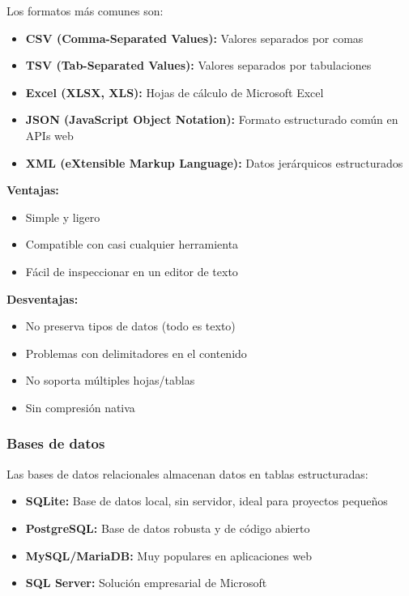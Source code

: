 \documentclass[a4paper,11pt]{article}
\begin{document}
Los formatos más comunes son:

\begin{itemize}
    \item \textbf{CSV (Comma-Separated Values):} Valores separados por comas
    \item \textbf{TSV (Tab-Separated Values):} Valores separados por tabulaciones
    \item \textbf{Excel (XLSX, XLS):} Hojas de cálculo de Microsoft Excel
    \item \textbf{JSON (JavaScript Object Notation):} Formato estructurado común en APIs web
    \item \textbf{XML (eXtensible Markup Language):} Datos jerárquicos estructurados
\end{itemize}

\begin{tcolorbox}[colback=ejemplocolor!20, colframe=unidadcolor, title=Ventajas y desventajas de CSV]
\textbf{Ventajas:}
\begin{itemize}
    \item Simple y ligero
    \item Compatible con casi cualquier herramienta
    \item Fácil de inspeccionar en un editor de texto
\end{itemize}

\textbf{Desventajas:}
\begin{itemize}
    \item No preserva tipos de datos (todo es texto)
    \item Problemas con delimitadores en el contenido
    \item No soporta múltiples hojas/tablas
    \item Sin compresión nativa
\end{itemize}
\end{tcolorbox}

\subsubsection{Bases de datos}

Las bases de datos relacionales almacenan datos en tablas estructuradas:

\begin{itemize}
    \item \textbf{SQLite:} Base de datos local, sin servidor, ideal para proyectos pequeños
    \item \textbf{PostgreSQL:} Base de datos robusta y de código abierto
    \item \textbf{MySQL/MariaDB:} Muy populares en aplicaciones web
    \item \textbf{SQL Server:} Solución empresarial de Microsoft
\end{itemize}
\end{document}
